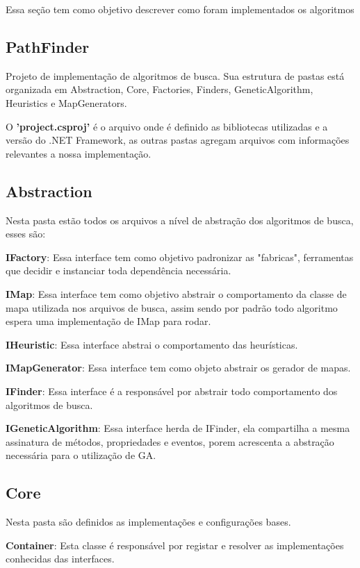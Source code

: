  Essa seção tem como objetivo descrever como foram implementados os algoritmos 
 
 \subsection {PathFinder}
 
 Projeto de implementação de algoritmos de busca.
 Sua estrutura de pastas está organizada em Abstraction, Core, Factories, Finders, GeneticAlgorithm, Heuristics e MapGenerators.
 
 O \textbf{'project.csproj'} é o arquivo onde é definido as bibliotecas utilizadas e a versão do .NET Framework, as outras pastas agregam arquivos com informações relevantes a nossa implementação.
 
 \subsection{Abstraction}	
 
 Nesta pasta estão todos os arquivos a nível de abstração dos algoritmos de busca, esses são:
 
 \textbf{IFactory}: Essa interface tem como objetivo padronizar as "fabricas", ferramentas que decidir e instanciar toda dependência necessária.
 
 \textbf{IMap}: Essa interface tem como objetivo abstrair o comportamento da classe de mapa utilizada nos arquivos de busca, assim sendo por padrão todo algoritmo espera uma implementação de IMap para rodar.
 
 \textbf{IHeuristic}: Essa interface abstrai o comportamento das heurísticas.
 
 \textbf{IMapGenerator}: Essa interface tem como objeto abstrair os gerador de mapas.
 
 \textbf{IFinder}: Essa interface é a responsável por abstrair todo comportamento dos algoritmos de busca.
 
 \textbf{IGeneticAlgorithm}: Essa interface herda de IFinder, ela compartilha a mesma assinatura de métodos, propriedades e eventos, porem acrescenta a abstração necessária para
 o utilização de GA.
 
 
 \subsection{Core}
 
 Nesta pasta são definidos as implementações e configurações bases.
 
 \textbf{Container}: Esta classe é responsável por registar e resolver as implementações conhecidas das interfaces.
 

